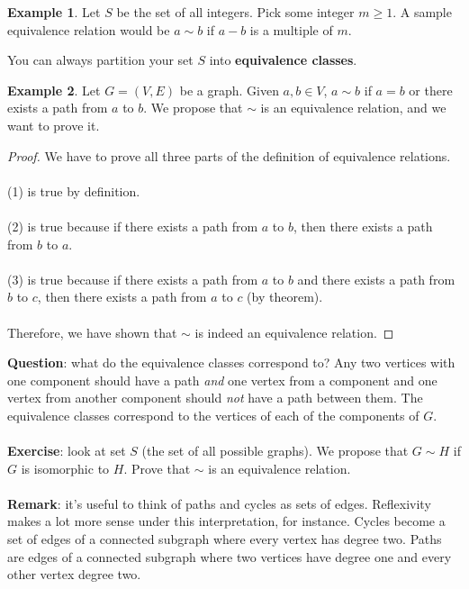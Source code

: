 \documentclass[]{article}
\theoremstyle{definition}
\newtheorem{ex}{Example}[section]
\begin{document}
				\begin{ex}
					Let $S$ be the set of all integers. Pick some integer $m \ge 1$. A sample equivalence relation would be $a \sim b$ if $a - b$ is a multiple of $m$.
				\end{ex}

				You can always partition your set $S$ into \textbf{equivalence classes}.
				
				\begin{ex}
					Let $G = (V, E)$ be a graph. Given $a, b \in V$, $a \sim b$ if $a = b$ or there exists a path from $a$ to $b$. We propose that $\sim$ is an equivalence relation, and we want to prove it.
					\begin{proof}
						We have to prove all three parts of the definition of equivalence relations.
						\\ \\
						(1) is true by definition.
						\\ \\
						(2) is true because if there exists a path from $a$ to $b$, then there exists a path from $b$ to $a$.
						\\ \\
						(3) is true because if there exists a path from $a$ to $b$ and there exists a path from $b$ to $c$, then there exists a path from $a$ to $c$ (by theorem).
						\\ \\
						Therefore, we have shown that $\sim$ is indeed an equivalence relation.
					\end{proof}
				\end{ex}

				\textbf{Question}: what do the equivalence classes correspond to? Any two vertices with one component should have a path \emph{and} one vertex from a component and one vertex from another component should \emph{not} have a path between them. The equivalence classes correspond to the vertices of each of the components of $G$.
				\\ \\
				\textbf{Exercise}: look at set $S$ (the set of all possible graphs). We propose that $G \sim H$ if $G$ is isomorphic to $H$. Prove that $\sim$ is an equivalence relation.
				\\ \\
				\textbf{Remark}: it's useful to think of paths and cycles as sets of edges. Reflexivity makes a lot more sense under this interpretation, for instance. Cycles become a set of edges of a connected subgraph where every vertex has degree two. Paths are edges of a connected subgraph where two vertices have degree one and every other vertex degree two.
				
\end{document}
